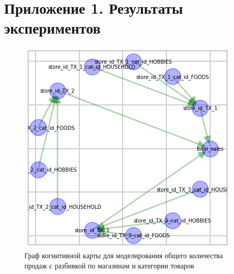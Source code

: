 ﻿\chapter{Приложение 1. Результаты экспериментов}

\def\figurename{Рис}
\begin{figure}[t]
	\centering
	\includegraphics[width=0.5\columnwidth]{./img/fcm_lstm_map.png}
	\caption{Граф когнитивной карты для моделирования общего количества продаж с разбивкой по магазинам и категории товаров}
	\label{img:fcm_lstm_map}
\end{figure}


